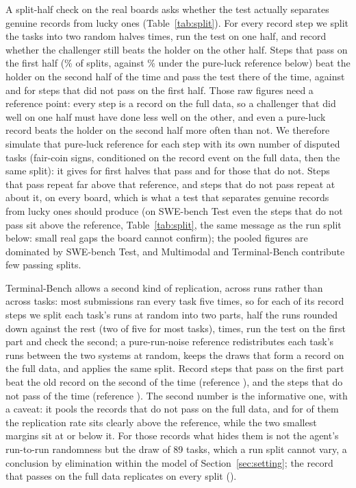 \documentclass[11pt]{article}
\begin{document}
A split-half check on the real boards asks whether the test actually separates genuine records from lucky ones (Table~\ref{tab:split}).
For every record step we split the tasks into two random halves \NumSplitR{} times, run the test on one half, and record whether the challenger still beats the holder on the other half.
Steps that pass on the first half (\NumSplitSigShare\% of splits, against \NumSplitNullSigShare\% under the pure-luck reference below) beat the holder on the second half \NumSplitSigRep{} of the time and pass the test there \NumSplitSigRepSig{} of the time, against \NumSplitNonRep{} and \NumSplitNonRepSig{} for steps that did not pass on the first half.
Those raw figures need a reference point: every step is a record on the full data, so a challenger that did well on one half must have done less well on the other, and even a pure-luck record beats the holder on the second half more often than not.
We therefore simulate that pure-luck reference for each step with its own number of disputed tasks (fair-coin signs, conditioned on the record event on the full data, then the same split): it gives \NumSplitNullSigRep{} for first halves that pass and \NumSplitNullNonRep{} for those that do not.
Steps that pass repeat far above that reference, and steps that do not pass repeat at about it, on every board, which is what a test that separates genuine records from lucky ones should produce (on SWE-bench Test even the steps that do not pass sit above the reference, Table~\ref{tab:split}, the same message as the run split below: small real gaps the board cannot confirm); the pooled figures are dominated by SWE-bench Test, and Multimodal and Terminal-Bench contribute few passing splits.

Terminal-Bench allows a second kind of replication, across runs rather than across tasks: most submissions ran every task five times, so for each of its \NumRunSplitSteps{} record steps we split each task's runs at random into two parts, half the runs rounded down against the rest (two of five for most tasks), \NumRunSplitR{} times, run the test on the first part and check the second; a pure-run-noise reference redistributes each task's runs between the two systems at random, keeps the draws that form a record on the full data, and applies the same split.
Record steps that pass on the first part beat the old record on the second \NumRunSplitSigRep{} of the time (reference \NumRunSplitNullSigRep{}), and the steps that do not pass \NumRunSplitNonRep{} of the time (reference \NumRunSplitNullNonRep{}).
The second number is the informative one, with a caveat: it pools the \NumRunSplitNonSteps{} records that do not pass on the full data, and for \NumRunSplitAboveRef{} of them the replication rate sits clearly above the reference, while the two smallest margins sit at or below it.
For those records what hides them is not the agent's run-to-run randomness but the draw of 89 tasks, which a run split cannot vary, a conclusion by elimination within the model of Section~\ref{sec:setting}; the \NumRunSplitFullSigSteps{} record that passes on the full data replicates on every split (\NumRunSplitFullSigRep{}).
\end{document}
